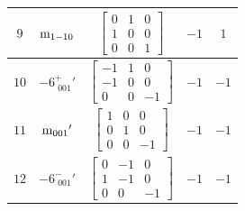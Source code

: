 \documentclass[fleqn,8pt]{jsarticle}
\begin{document}
\begin{longtable}{ccccc}
$ 9 $ & $ {\rm m}_{1-10} $ & $ \begin{bmatrix} 0 & 1 & 0 \\ 1 & 0 & 0 \\ 0 & 0 & 1 \end{bmatrix} $ & $ -1 $ & $ 1 $ \\ \hline
$ 10 $ & $ -6^{+}_{\,\,001}{}' $ & $ \begin{bmatrix} -1 & 1 & 0 \\ -1 & 0 & 0 \\ 0 & 0 & -1 \end{bmatrix} $ & $ -1 $ & $ -1 $ \\ \hline
$ 11 $ & $ {\rm m}_{001}{}' $ & $ \begin{bmatrix} 1 & 0 & 0 \\ 0 & 1 & 0 \\ 0 & 0 & -1 \end{bmatrix} $ & $ -1 $ & $ -1 $ \\ \hline
$ 12 $ & $ -6^{-}_{\,\,001}{}' $ & $ \begin{bmatrix} 0 & -1 & 0 \\ 1 & -1 & 0 \\ 0 & 0 & -1 \end{bmatrix} $ & $ -1 $ & $ -1 $ \\
\end{longtable}
\end{document}
